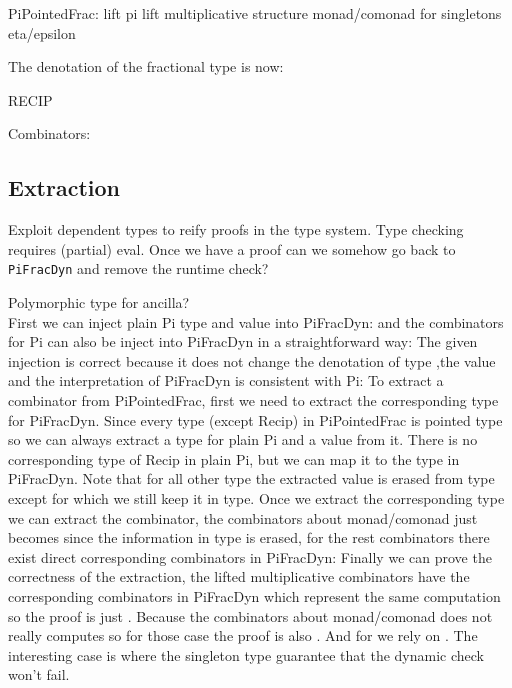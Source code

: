 \documentclass[sigplan,10pt,review,anonymous]{acmart}
\begin{document}
PiPointedFrac:
lift pi
lift multiplicative structure
monad/comonad for singletons
eta/epsilon

The denotation of the fractional type is now:

\PIPFUdef{}

RECIP 

Combinators:
\PIPFCombDef{}

\subsection{Extraction}


Exploit dependent types to reify proofs in the type system. Type
checking requires (partial) eval. Once we have a proof can we somehow
go back to \verb|PiFracDyn| and remove the runtime check?

Polymorphic type for ancilla?
\\
First we can inject plain Pi type and value into PiFracDyn:
\INJU{}
and the combinators for Pi can also be inject into PiFracDyn in a straightforward way:
\INJcomb{}
The given injection is correct because it does not change the denotation of type
\INJUeq{}
,the value
\INJVeq{}
and the interpretation of PiFracDyn is consistent with Pi:
\INJEvaleq{}
To extract a combinator from PiPointedFrac, first we need to extract the corresponding type for PiFracDyn.
Since every type (except Recip) in PiPointedFrac is pointed type so we can always extract a type for plain
Pi and a value from it.
There is no corresponding type of Recip in plain Pi, but we can map it to the
\AgdaSpace{} type in PiFracDyn.
Note that for all other type the extracted value is erased from type except for
\AgdaSpace{}
which we still keep it in type.
\EXTU{}
Once we extract the corresponding type we can extract the combinator, the combinators about monad/comonad
just becomes  since the information in type is erased,
for the rest combinators there exist direct corresponding combinators in PiFracDyn:
\EXTUComb{}
Finally we can prove the correctness of the extraction,
the lifted multiplicative combinators have the corresponding combinators in PiFracDyn which represent
the same computation so the proof is just .
Because the combinators about monad/comonad does not really
computes so for those case the proof is also .
And for  we rely on .
The interesting case is  where the singleton type guarantee that
the dynamic check won't fail.
\EXTeq{}
\end{document}
